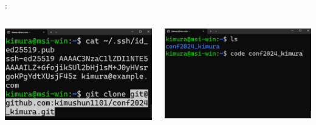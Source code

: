 \documentclass[aspectratio=169,dvipdfmx,cjk]{beamer}
\begin{document}
\begin{frame}{\insertsection \thesubsection: \insertsubsection }
\begin{columns}
    \begin{column}{0.3\textwidth}
      \includegraphics[width=1.0\linewidth]{fig/git-clone.png}
    \end{column}
    \begin{column}{0.3\textwidth}
      \includegraphics[width=1.0\linewidth]{fig/code-repo.png}
    \end{column}
  \end{columns}
\end{frame}
\end{document}
